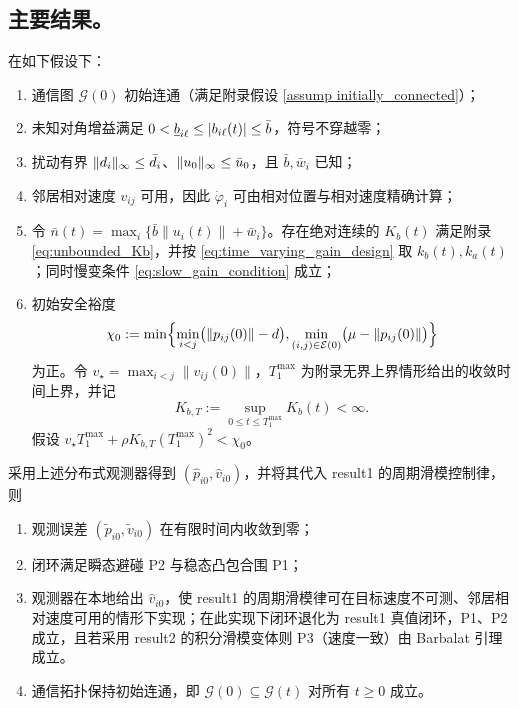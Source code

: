 \subsection{主要结果。}
\begin{theorem}\label{thm observer}
    在如下假设下：
    \begin{enumerate}[label=(A\arabic*)]
        \item 通信图 $\mathcal G(0)$ 初始连通（满足附录假设 \ref{assump initially_connected}）；
        \item 未知对角增益满足 $0<\underline{b}_{i\ell}\le |b_{i\ell}(t)|\le\bar b$，符号不穿越零；
        \item 扰动有界 $\|d_i\|_\infty\le\bar{d}_i$、$\|u_0\|_\infty\le\bar{u}_0$，且 $\bar b,\bar w_i$ 已知；
        \item 邻居相对速度 $v_{ij}$ 可用，因此 $\dot\varphi_i$ 可由相对位置与相对速度精确计算；
        \item 令 $\bar n(t)=\max_i\{\bar b\|u_i(t)\|+\bar w_i\}$。存在绝对连续的 $K_b(t)$ 满足附录 \eqref{eq:unbounded_Kb}，并按 \eqref{eq:time_varying_gain_design} 取 $k_b(t),k_a(t)$；同时慢变条件 \eqref{eq:slow_gain_condition} 成立；
        \item 初始安全裕度
        \[
            \chi_0:=\min\Bigl\{\min_{i<j}\bigl(\|p_{ij}(0)\|-d\bigr),
            \min_{(i,j)\in\mathcal E(0)}\bigl(\mu-\|p_{ij}(0)\|\bigr)\Bigr\}
        \]
        为正。令 $v_\star=\max_{i<j}\|v_{ij}(0)\|$，$T_1^{\max}$ 为附录无界上界情形给出的收敛时间上界，并记
        \[
            K_{b,T}:=\sup_{0\le t\le T_1^{\max}}K_b(t)<\infty .
        \]
        假设 $v_\star T_1^{\max}+\rho K_{b,T}(T_1^{\max})^2<\chi_0$。
    \end{enumerate}
    采用上述分布式观测器得到 $(\hat p_{i0},\hat v_{i0})$，并将其代入 result1 的周期滑模控制律，则
    \begin{enumerate}[label=(\roman*)]
        \item 观测误差 $(\tilde p_{i0},\tilde v_{i0})$ 在有限时间内收敛到零；
        \item 闭环满足瞬态避碰 P2 与稳态凸包合围 P1；
        \item 观测器在本地给出 $\hat v_{i0}$，使 result1 的周期滑模律可在目标速度不可测、邻居相对速度可用的情形下实现；在此实现下闭环退化为 result1 真值闭环，P1、P2 成立，且若采用 result2 的积分滑模变体则 P3（速度一致）由 Barbalat 引理成立。
        \item 通信拓扑保持初始连通，即 $\mathcal G(0)\subseteq\mathcal G(t)$ 对所有 $t\ge0$ 成立。
    \end{enumerate}
\end{theorem}

